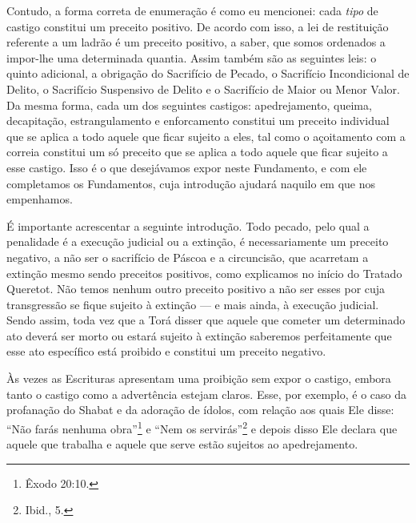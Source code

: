 Contudo, a forma correta de enumeração é como eu mencionei: cada
\emph{tipo} de castigo constitui um preceito positivo. De acordo com
isso, a lei de restituição referente a um ladrão é um preceito positivo,
a saber, que somos ordenados a impor-lhe uma determinada quantia. Assim
também são as seguintes leis: o quinto adicional, a obrigação do
Sacrifício de Pecado, o Sacrifício
Incondicional de Delito, o Sacrifício Suspensivo de Delito e o
Sacrifício de Maior ou Menor Valor. Da mesma forma, cada um dos
seguintes castigos: apedrejamento, queima, decapitação, estrangulamento
e enforcamento constitui um preceito individual que se aplica a todo
aquele que ficar sujeito a eles, tal como o açoitamento com a correia
constitui um só preceito que se aplica a todo aquele que ficar sujeito a
esse castigo. Isso é o que desejávamos expor neste Fundamento, e com
ele completamos os Fundamentos, cuja introdução ajudará naquilo em que
nos empenhamos.

É importante acrescentar a seguinte introdução. Todo pecado, pelo qual a
penalidade é a execução judicial ou a extinção, é necessariamente um
preceito negativo, a não ser o sacrifício de Páscoa e a circuncisão, que
acarretam a extinção mesmo sendo preceitos positivos, como explicamos
no início do Tratado Queretot. Não temos nenhum outro preceito positivo
a não ser esses por cuja transgressão se fique sujeito à extinção --- e
mais ainda, à execução judicial. Sendo assim, toda vez que a Torá
disser que aquele que cometer um determinado ato deverá ser morto ou
estará sujeito à extinção saberemos perfeitamente que esse ato
específico está proibido e constitui um preceito negativo.

Às vezes as Escrituras apresentam uma proibição sem expor o castigo,
embora tanto o castigo como a advertência estejam claros. Esse, por
exemplo, é o caso da profanação do Shabat e da adoração de ídolos, com
relação aos quais Ele disse: ``Não farás nenhuma obra''\footnote{Êxodo 20:10.} e
``Nem os servirás''\footnote{Ibid., 5.} e depois disso Ele declara que aquele
que trabalha e aquele que serve estão sujeitos ao apedrejamento.

